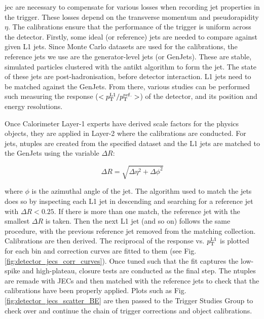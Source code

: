 \Gls{jec} are necessary to compensate for various losses when recording jet properties in the trigger. These losses depend on the transverse momentum \pt and pseudorapidity $\eta$. The calibrations ensure that the performance of the trigger is uniform across the detector. Firstly, some ideal (or reference) jets are needed to compare against given L1 jets. Since Monte Carlo datasets are used for the calibrations, the reference jets we use are the generator-level jets (or GenJets). These are stable, simulated particles clustered with the \gls{antikt} algorithm \cite{Cacciari:2008gp} to form the jet. The state of these jets are post-hadronisation, before detector interaction. L1 jets need to be matched against the GenJets. From there, various studies can be performed such measuring the response ($< p_{\mathrm{T}}^{{\mathrm{L1}}} / p_{\mathrm{T}}^{{\mathrm{ref.}}} >$) of the detector, and its position and energy resolutions.

Once Calorimeter Layer-1 experts have derived scale factors for the physics objects, they are applied in Layer-2 where the calibrations are conducted. For jets, ntuples are created from the specified dataset and the L1 jets are matched to the GenJets using the variable $\Delta R$: 

\begin{equation}
\Delta R = \sqrt{\Delta \eta^2 + \Delta \phi^2}
\label{eq:delta_r}
\end{equation}

where $\phi$ is the azimuthal angle of the jet. The algorithm used to match the jets does so by inspecting each L1 jet in descending \pt and searching for a reference jet with $\Delta R < 0.25$. If there is more than one match, the reference jet with the smallest $\Delta R$ is taken. Then the next L1 jet (and so on) follows the same procedure, with the previous reference jet removed from the matching collection. Calibrations are then derived. The reciprocal of the response vs. $p_{\mathrm{T}}^{{\mathrm{L1}}}$ is plotted for each \abseta bin and correction curves are fitted to them (see Fig. \ref{fig:detector_jecs_corr_curves}). Once tuned such that the fit captures the low-\pt spike and high-\pt plateau, closure tests are conducted as the final step. The ntuples are remade with JECs and then matched with the reference jets to check that the calibrations have been properly applied. Plots such as Fig. \ref{fig:detector_jecs_scatter_BE} are then passed to the Trigger Studies Group to check over and continue the chain of trigger corrections and object calibrations.

